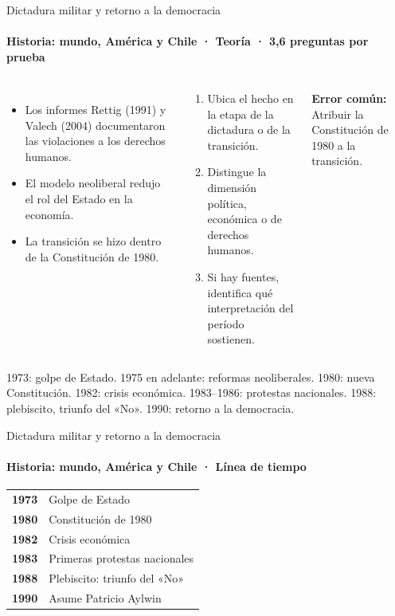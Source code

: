 \documentclass[aspectratio=169,11pt]{beamer}
\makeatletter
\newenvironment{lineatiempo}
  {\footnotesize\renewcommand{\arraystretch}{1.15}\begin{tabular}{@{}>{\leavevmode\bfseries\color{zinc700}}p{0.14\textwidth}p{0.74\textwidth}@{}}}
  {\end{tabular}}
\newlength{\ajustealto}
\newenvironment{ajustar}[1][0.74\textheight]
  {\setlength{\ajustealto}{#1}\begin{lrbox}{\ajustecaja}\begin{minipage}{\textwidth}}
  {\end{minipage}\end{lrbox}%
   \ifdim\dimexpr\ht\ajustecaja+\dp\ajustecaja\relax>\ajustealto
     \resizebox*{!}{\ajustealto}{\usebox{\ajustecaja}}\else\usebox{\ajustecaja}\fi}
\makeatother
\begin{document}
\begin{frame}{Dictadura militar y retorno a la democracia}
\label{tema-hi-dictadura}
\framesubtitle{Historia: mundo, América y Chile · Teoría · 3,6 preguntas por prueba}
\begin{ajustar}
\begin{columns}[T,onlytextwidth]
\begin{itemize}\footnotesize
\item Los informes Rettig (1991) y Valech (2004) documentaron las violaciones a los derechos humanos.
\item El modelo neoliberal redujo el rol del Estado en la economía.
\item La transición se hizo dentro de la Constitución de 1980.
\end{itemize}
\begin{cajaregla}\scriptsize \begin{enumerate}\item Ubica el hecho en la etapa de la dictadura o de la transición.\item Distingue la dimensión política, económica o de derechos humanos.\item Si hay fuentes, identifica qué interpretación del período sostienen.\end{enumerate}\end{cajaregla}
\begin{notagris}\scriptsize \textbf{Error común:} Atribuir la Constitución de 1980 a la transición.\end{notagris}
\end{columns}
\begin{cajaclave}[Etapas]\footnotesize
1973: golpe de Estado. 1975 en adelante: reformas neoliberales. 1980: nueva Constitución. 1982: crisis económica. 1983–1986: protestas nacionales. 1988: plebiscito, triunfo del «No». 1990: retorno a la democracia.
\end{cajaclave}
\end{ajustar}
\end{frame}

\begin{frame}{Dictadura militar y retorno a la democracia}
\framesubtitle{Historia: mundo, América y Chile · Línea de tiempo}
\begin{lineatiempo}
1973 & Golpe de Estado \\
1980 & Constitución de 1980 \\
1982 & Crisis económica \\
1983 & Primeras protestas nacionales \\
1988 & Plebiscito: triunfo del «No» \\
1990 & Asume Patricio Aylwin \\
\end{lineatiempo}
\end{frame}
\end{document}
